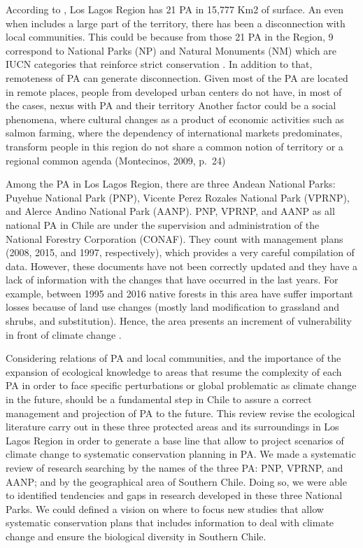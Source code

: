 \documentclass[]{article}
\begin{document}
According to \citet{ProtectedAreas}, Los Lagos Region has 21 PA in 15,777 Km2 of surface.
An even when includes a large part of the territory, there has been a disconnection with local communities.
This could be because from those 21 PA in the Region, 9 correspond to National Parks (NP) and Natural Monuments (NM) which are IUCN categories that reinforce strict conservation \citep{dudley2008guidelines}.
In addition to that, remoteness of PA can generate disconnection. Given most of the PA are located in remote places, people from developed urban centers do not have, in most of the cases, nexus with PA and their territory \citep{joppa2009high}
Another factor could be a social phenomena, where cultural changes as a product of economic activities such as salmon farming, where the dependency of international markets predominates, transform people in this region do not share a common notion of territory or a regional common agenda (Montecinos, 2009, p.~24)

Among the PA in Los Lagos Region, there are three Andean National Parks: Puyehue National Park (PNP), Vicente Perez Rozales National Park (VPRNP), and Alerce Andino National Park (AANP). PNP, VPRNP, and AANP as all national PA in Chile are under the supervision and administration of the National Forestry Corporation (CONAF). They count with management plans (2008, 2015, and 1997, respectively), which provides a very careful compilation of data. However, these documents have not been correctly updated and they have a lack of information with the changes that have occurred in the last years. For example, between 1995 and 2016 native forests in this area have suffer important losses because of land use changes (mostly land modification to grassland and shrubs, and substitution).
Hence, the area presents an increment of vulnerability in front of climate change \citep{marquet2019biodiversidad}.

Considering relations of PA and local communities, and the importance of the expansion of ecological knowledge to areas that resume the complexity of each PA in order to face specific perturbations or global problematic as climate change in the future, should be a fundamental step in Chile to assure a correct management and projection of PA to the future.
This review revise the ecological literature carry out in these three protected areas and its surroundings in Los Lagos Region in order to generate a base line that allow to project scenarios of climate change to systematic conservation planning in PA.
We made a systematic review of research searching by the names of the three PA: PNP, VPRNP, and AANP; and by the geographical area of Southern Chile.
Doing so, we were able to identified tendencies and gaps in research developed in these three National Parks. We could defined a vision on where to focus new studies that allow systematic conservation plans that includes information to deal with climate change and ensure the biological diversity in Southern Chile.
\end{document}
